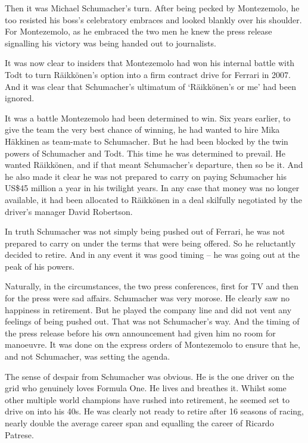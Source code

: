 \documentclass{article}
\begin{document}
Then it was Michael Schumacher’s turn. After being pecked by Montezemolo, he too resisted his boss’s celebratory embraces and looked blankly over his shoulder. For Montezemolo, as he embraced the two men he knew the press release signalling his victory was being handed out to journalists.

It was now clear to insiders that Montezemolo had won his internal battle with Todt to turn Räikkönen’s option into a firm contract drive for Ferrari in 2007. And it was clear that Schumacher’s ultimatum of ‘Räikkönen’s or me’ had been ignored.

It was a battle Montezemolo had been determined to win. Six years earlier, to give the team the very best chance of winning, he had wanted to hire Mika Häkkinen as team-mate to Schumacher. But he had been blocked by the twin powers of Schumacher and Todt. This time he was determined to prevail. He wanted Räikkönen, and if that meant Schumacher’s departure, then so be it. And he also made it clear he was not prepared to carry on paying Schumacher his US\$45 million a year in his twilight years. In any case that money was no longer available, it had been allocated to Räikkönen in a deal skilfully negotiated by the driver’s manager David Robertson.

In truth Schumacher was not simply being pushed out of Ferrari, he was not prepared to carry on under the terms that were being offered. So he reluctantly decided to retire. And in any event it was good timing – he was going out at the peak of his powers.

Naturally, in the circumstances, the two press conferences, first for TV and then for the press were sad affairs. Schumacher was very morose. He clearly saw no happiness in retirement. But he played the company line and did not vent any feelings of being pushed out. That was not Schumacher’s way. And the timing of the press release before his own announcement had given him no room for manoeuvre. It was done on the express orders of Montezemolo to ensure that he, and not Schumacher, was setting the agenda.

The sense of despair from Schumacher was obvious. He is the one driver on the grid who genuinely loves Formula One. He lives and breathes it. Whilst some other multiple world champions have rushed into retirement, he seemed set to drive on into his 40s. He was clearly not ready to retire after 16 seasons of racing, nearly double the average career span and equalling the career of Ricardo Patrese.
\end{document}
